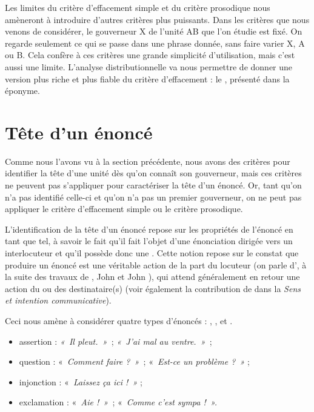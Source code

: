 Les limites du critère d’effacement simple et du critère prosodique nous amèneront à introduire d’autres critères plus puissants. Dans les critères que nous venons de considérer, le gouverneur X de l’unité AB que l’on étudie est fixé. On regarde seulement ce qui se passe dans une phrase donnée, sans faire varier X, A ou B. Cela confère à ces critères une grande simplicité d’utilisation, mais c’est aussi une limite. L’analyse distributionnelle va nous permettre de donner une version plus riche et plus fiable du critère d’effacement : le , présenté dans la  éponyme.

\section{Tête d’un énoncé}\label{sec:3.3.8}

Comme nous l’avons vu à la section précédente, nous avons des critères pour identifier la tête d’une unité dès qu’on connaît son gouverneur, mais ces critères ne peuvent pas s’appliquer pour caractériser la tête d’un énoncé. Or, tant qu’on n’a pas identifié celle-ci et qu’on n’a pas un premier gouverneur, on ne peut pas appliquer le critère d’effacement simple ou le critère prosodique.

L’identification de la tête d’un énoncé repose sur les propriétés de l’énoncé en tant que tel, à savoir le fait qu’il fait l’objet d’une énonciation dirigée vers un interlocuteur et qu’il possède donc une . Cette notion repose sur le constat que produire un énoncé est une véritable action de la part du locuteur (on parle d’, à la suite des travaux de \citet{Gardiner1932}, John \citet{Austin1962} et John \citet{Searle1969}), qui attend généralement en retour une action du ou des destinataire(s) (voir également la contribution de \citet{Bloomfield1933} dans la  \textit{Sens et intention communicative}).

Ceci nous amène à considérer quatre types d’énoncés : , ,  et .

\begin{itemize}
\item assertion : \textit{«~Il pleut.~»~}; \textit{«~J’ai mal au ventre.~»~};
\item question : «~\textit{Comment faire ?~»~}; «~\textit{Est-ce un problème ?~»} ;
\item injonction : «~\textit{Laissez ça ici !~»} ;
\item exclamation : «~\textit{Aie !~»~}; «~\textit{Comme c’est sympa !~».}
\end{itemize}

